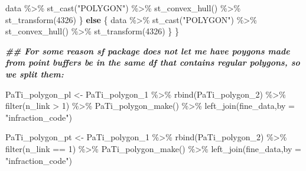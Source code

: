 \documentclass[
]{article}
\newenvironment{Shaded}{\begin{snugshade}}{\end{snugshade}}
\newcommand{\AttributeTok}[1]{\textcolor[rgb]{0.77,0.63,0.00}{#1}}
\newcommand{\ControlFlowTok}[1]{\textcolor[rgb]{0.13,0.29,0.53}{\textbf{#1}}}
\newcommand{\DecValTok}[1]{\textcolor[rgb]{0.00,0.00,0.81}{#1}}
\newcommand{\DocumentationTok}[1]{\textcolor[rgb]{0.56,0.35,0.01}{\textbf{\textit{#1}}}}
\newcommand{\FunctionTok}[1]{\textcolor[rgb]{0.00,0.00,0.00}{#1}}
\newcommand{\NormalTok}[1]{#1}
\newcommand{\OtherTok}[1]{\textcolor[rgb]{0.56,0.35,0.01}{#1}}
\newcommand{\SpecialCharTok}[1]{\textcolor[rgb]{0.00,0.00,0.00}{#1}}
\newcommand{\StringTok}[1]{\textcolor[rgb]{0.31,0.60,0.02}{#1}}
\begin{document}
\begin{Shaded}
\begin{Highlighting}[]
\NormalTok{    data }\SpecialCharTok{\%\textgreater{}\%} 
      \FunctionTok{st\_cast}\NormalTok{(}\StringTok{"POLYGON"}\NormalTok{) }\SpecialCharTok{\%\textgreater{}\%}
      \FunctionTok{st\_convex\_hull}\NormalTok{() }\SpecialCharTok{\%\textgreater{}\%} 
      \FunctionTok{st\_transform}\NormalTok{(}\DecValTok{4326}\NormalTok{)}
\NormalTok{  \} }\ControlFlowTok{else}\NormalTok{ \{}
\NormalTok{    data }\SpecialCharTok{\%\textgreater{}\%}
      \FunctionTok{st\_cast}\NormalTok{(}\StringTok{"POLYGON"}\NormalTok{) }\SpecialCharTok{\%\textgreater{}\%}
      \FunctionTok{st\_convex\_hull}\NormalTok{() }\SpecialCharTok{\%\textgreater{}\%} 
      \FunctionTok{st\_transform}\NormalTok{(}\DecValTok{4326}\NormalTok{)}
\NormalTok{  \}}
\NormalTok{\}}

\DocumentationTok{\#\# For some reason sf package does not let me have poygons made from point buffers be in the same df that contains regular polygons, so we split them: }

\NormalTok{PaTi\_polygon\_pl }\OtherTok{\textless{}{-}}\NormalTok{ PaTi\_polygon\_1 }\SpecialCharTok{\%\textgreater{}\%}
  \FunctionTok{rbind}\NormalTok{(PaTi\_polygon\_2) }\SpecialCharTok{\%\textgreater{}\%}
  \FunctionTok{filter}\NormalTok{(n\_link }\SpecialCharTok{\textgreater{}} \DecValTok{1}\NormalTok{) }\SpecialCharTok{\%\textgreater{}\%} 
  \FunctionTok{PaTi\_polygon\_make}\NormalTok{() }\SpecialCharTok{\%\textgreater{}\%} 
  \FunctionTok{left\_join}\NormalTok{(fine\_data,}\AttributeTok{by =} \StringTok{"infraction\_code"}\NormalTok{)}

\NormalTok{PaTi\_polygon\_pt }\OtherTok{\textless{}{-}}\NormalTok{ PaTi\_polygon\_1 }\SpecialCharTok{\%\textgreater{}\%}
  \FunctionTok{rbind}\NormalTok{(PaTi\_polygon\_2) }\SpecialCharTok{\%\textgreater{}\%}
  \FunctionTok{filter}\NormalTok{(n\_link }\SpecialCharTok{==} \DecValTok{1}\NormalTok{) }\SpecialCharTok{\%\textgreater{}\%} 
  \FunctionTok{PaTi\_polygon\_make}\NormalTok{() }\SpecialCharTok{\%\textgreater{}\%} 
  \FunctionTok{left\_join}\NormalTok{(fine\_data,}\AttributeTok{by =} \StringTok{"infraction\_code"}\NormalTok{)}
  


\end{Highlighting}
\end{Shaded}
\end{document}
